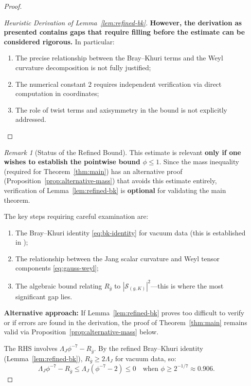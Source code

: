 \documentclass[12pt]{article}
\theoremstyle{plain}
\theoremstyle{definition}
\theoremstyle{remark}
\newtheorem{remark}[theorem]{Remark}
\newcommand{\bg}{\bar{g}}
\begin{document}
\begin{proof}
\begin{proof}[Heuristic Derivation of Lemma~\ref{lem:refined-bk}]
\textbf{However, the derivation as presented contains gaps that require filling before the estimate can be considered rigorous.} In particular:
\begin{enumerate}
\item The precise relationship between the Bray--Khuri terms and the Weyl curvature decomposition is not fully justified;
\item The numerical constant $2$ requires independent verification via direct computation in coordinates;
\item The role of twist terms and axisymmetry in the bound is not explicitly addressed.
\end{enumerate}
\end{proof}

\begin{remark}[Status of the Refined Bound]\label{rem:refined-bk-verification}
This estimate is relevant \textbf{only if one wishes to establish the pointwise bound $\phi \leq 1$}. Since the mass inequality (required for Theorem~\ref{thm:main}) has an alternative proof (Proposition~\ref{prop:alternative-mass}) that avoids this estimate entirely, verification of Lemma~\ref{lem:refined-bk} is \textbf{optional} for validating the main theorem.

The key steps requiring careful examination are:
\begin{enumerate}
    \item The Bray--Khuri identity \eqref{eq:bk-identity} for vacuum data (this is established in \cite{braykhuri2010});
    \item The relationship between the Jang scalar curvature and Weyl tensor components \eqref{eq:gauss-weyl};
    \item The algebraic bound relating $R_{\bg}$ to $|\mathcal{S}_{(g,K)}|^2$---this is where the most significant gap lies.
\end{enumerate}

\textbf{Alternative approach:} If Lemma~\ref{lem:refined-bk} proves too difficult to verify or if errors are found in the derivation, the proof of Theorem~\ref{thm:main} remains valid via Proposition~\ref{prop:alternative-mass} below.
\end{remark}

The RHS involves $\Lambda_J \phi^{-7} - R_{\bg}$. By the refined Bray--Khuri identity (Lemma~\ref{lem:refined-bk}), $R_{\bg} \geq 2\Lambda_J$ for vacuum data, so:
\[
\Lambda_J \phi^{-7} - R_{\bg} \leq \Lambda_J(\phi^{-7} - 2) \leq 0 \quad \text{when } \phi \geq 2^{-1/7} \approx 0.906.
\]


\end{proof}
\end{document}
